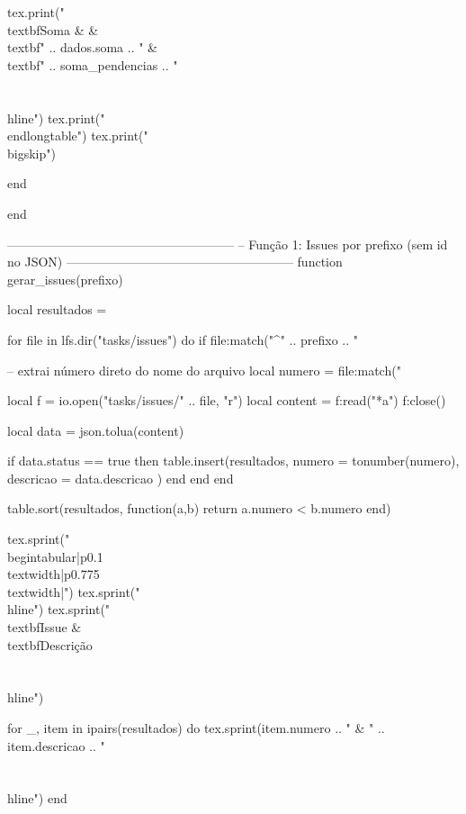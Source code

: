 \begin{luacode*}
    tex.print("\\textbf{Soma} &  & \\textbf{" .. dados.soma .. "} & \\textbf{" .. soma_pendencias .. "} \\\\ \\hline")
    tex.print("\\end{longtable}")
    tex.print("\\bigskip")

  end

end


------------------------------------------------------
-- Função 1: Issues por prefixo (sem id no JSON)
------------------------------------------------------
function gerar_issues(prefixo)

  local resultados = {}

  for file in lfs.dir("tasks/issues") do
    if file:match("^" .. prefixo .. "%

      -- extrai número direto do nome do arquivo
      local numero = file:match("%

      local f = io.open("tasks/issues/" .. file, "r")
      local content = f:read("*a")
      f:close()

      local data = json.tolua(content)

      if data.status == true then
        table.insert(resultados, {
          numero = tonumber(numero),
          descricao = data.descricao
        })
      end
    end
  end

  table.sort(resultados, function(a,b)
    return a.numero < b.numero
  end)

  tex.sprint("\\begin{tabular}{|p{0.1\\textwidth}|p{0.775\\textwidth}|}")
  tex.sprint("\\hline")
  tex.sprint("\\textbf{Issue} & \\textbf{Descrição} \\\\ \\hline")

  for _, item in ipairs(resultados) do
    tex.sprint(item.numero .. " & " .. item.descricao .. " \\\\ \\hline")
  end


\end{luacode*}
